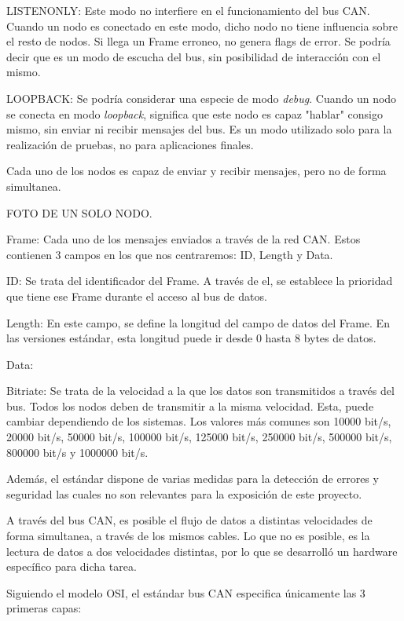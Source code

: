 LISTENONLY: Este modo no interfiere en el funcionamiento del bus CAN. Cuando un nodo es conectado en este modo, dicho nodo no tiene influencia sobre el resto de nodos. Si llega un Frame erroneo, no genera flags de error. Se podría decir que es un modo de escucha del bus, sin posibilidad de interacción con el mismo.

LOOPBACK: Se podría considerar una especie de modo \emph{debug}. Cuando un nodo se conecta en modo \emph{loopback}, significa que este nodo es capaz "hablar" consigo mismo, sin enviar ni recibir mensajes del bus. Es un modo utilizado solo para la realización de pruebas, no para aplicaciones finales.



Cada uno de los nodos es capaz de enviar y recibir mensajes, pero no de forma simultanea.

FOTO DE UN SOLO NODO.

Frame:
Cada uno de los mensajes enviados a través de la red CAN. Estos contienen 3 campos en los que nos centraremos: ID, Length y Data.

ID: Se trata del identificador del Frame. A través de el, se establece la prioridad que tiene ese Frame durante el acceso al bus de datos.

Length: En este campo, se define la longitud del campo de datos del Frame. En las versiones estándar, esta longitud puede ir desde 0 hasta 8 bytes de datos.

Data:


Bitriate: Se trata de la velocidad a la que los datos son transmitidos a través del bus. Todos los nodos deben de transmitir a la misma velocidad. Esta, puede cambiar dependiendo de los sistemas. Los valores más comunes son 			     10000 bit/s, 20000 bit/s, 50000 bit/s, 100000 bit/s, 125000 bit/s, 250000 bit/s, 500000 bit/s, 800000 bit/s y  1000000 bit/s.

Además, el estándar dispone de varias medidas para la detección de errores y seguridad las cuales no son relevantes para la exposición de este proyecto.

A través del bus CAN, es posible el flujo de datos a distintas velocidades de forma simultanea, a través de los mismos cables. Lo que no es posible, es la lectura de datos a dos velocidades distintas, por lo que se desarrolló un hardware específico para dicha tarea.



Siguiendo el modelo OSI, el estándar bus CAN especifica únicamente las 3 primeras capas:

